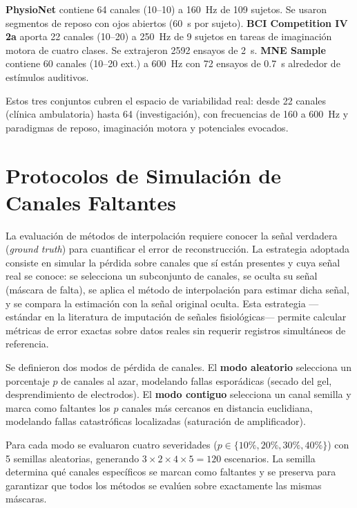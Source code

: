 \textbf{PhysioNet} \cite{goldberger2000physiobank,schalk2004bci2000} contiene 64 canales (10--10) a 160~Hz de 109 sujetos. Se usaron segmentos de reposo con ojos abiertos (60~s por sujeto). \textbf{BCI Competition IV 2a} \cite{brunner2008bci} aporta 22 canales (10--20) a 250~Hz de 9 sujetos en tareas de imaginación motora de cuatro clases. Se extrajeron 2592 ensayos de 2~s. \textbf{MNE Sample} \cite{gramfort2013meg} contiene 60 canales (10--20 ext.) a 600~Hz con 72 ensayos de 0.7~s alrededor de estímulos auditivos.

Estos tres conjuntos cubren el espacio de variabilidad real: desde 22 canales (clínica ambulatoria) hasta 64 (investigación), con frecuencias de 160 a 600~Hz y paradigmas de reposo, imaginación motora y potenciales evocados.
\section{Protocolos de Simulación de Canales Faltantes}

La evaluación de métodos de interpolación requiere conocer la señal verdadera (\textit{ground truth}) para cuantificar el error de reconstrucción. La estrategia adoptada consiste en simular la pérdida sobre canales que sí están presentes y cuya señal real se conoce: se selecciona un subconjunto de canales, se oculta su señal (máscara de falta), se aplica el método de interpolación para estimar dicha señal, y se compara la estimación con la señal original oculta. Esta estrategia ---estándar en la literatura de imputación de señales fisiológicas--- permite calcular métricas de error exactas sobre datos reales sin requerir registros simultáneos de referencia.

Se definieron dos modos de pérdida de canales. El \textbf{modo aleatorio} selecciona un porcentaje $p$ de canales al azar, modelando fallas esporádicas (secado del gel, desprendimiento de electrodos). El \textbf{modo contiguo} selecciona un canal semilla y marca como faltantes los $p$ canales más cercanos en distancia euclidiana, modelando fallas catastróficas localizadas (saturación de amplificador).

Para cada modo se evaluaron cuatro severidades ($p \in \{10\%, 20\%, 30\%, 40\%\}$) con 5 semillas aleatorias, generando $3 \times 2 \times 4 \times 5 = 120$ escenarios. La semilla determina qué canales específicos se marcan como faltantes y se preserva para garantizar que todos los métodos se evalúen sobre exactamente las mismas máscaras.

